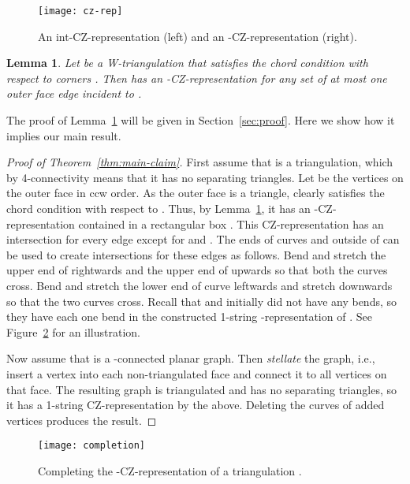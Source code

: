 \documentclass{article}
\renewcommand{\int}[1]{}
\newtheorem{lemma}[theorem]{Lemma}
\begin{document}
\begin{figure}
    \centering
    \texttt{[image: cz-rep]}
    \caption{An int-CZ-representation (left) 
and an \int{(C,c_2)}-CZ-representation (right).}
    \label{fig:partial-cz-ex}
\end{figure}

\begin{lemma}
	\label{lem:representation}
    Let  be a W-triangulation that 
    satisfies the chord condition with respect to corners . 
	Then  has an \int{F}-CZ-representation
    for any set  of at most one outer face edge incident to .
\end{lemma}

The proof of Lemma~\ref{lem:representation} will be given in Section~\ref{sec:proof}. Here we show how it implies our main result.

\begin{proof}[Proof of Theorem~\ref{thm:main-claim}]
First assume that  is a triangulation, which by 4-con\-nec\-tivity means that
it has no separating triangles. Let  be the vertices on the outer face
in ccw order.
As the outer face is a triangle,  clearly satisfies the chord condition with respect to .
Thus, by Lemma~\ref{lem:representation}, it has an
\int{(B,C)}-CZ-representation contained in a rectangular box .  This
CZ-representation has an intersection for 
every edge except for  and . The  ends of curves  and 
outside of  can be used to create intersections for these edges
as follows.
Bend and stretch the upper end of  rightwards and the upper end of  upwards so that
both the curves cross. 
Bend and stretch the lower end of curve  leftwards and stretch  downwards so that the two curves cross.
Recall that  and  initially did not have any bends, so they have each one bend in the
constructed 1-string 
-representation of . See Figure~\ref{fig:completion} for an illustration.

Now assume that  is a -connected planar graph. Then \emph{stellate} the graph, i.e.,
insert a vertex into each non-triangulated face and connect it to all vertices on that face.
The resulting graph is triangulated and has no separating triangles, so it has a 1-string CZ-representation
by the above. Deleting the curves of added vertices produces the result. 
\end{proof}

\begin{figure}
    \centering
    \texttt{[image: completion]}
    \caption{Completing the \int{F}-CZ-representation of a triangulation .}
    \label{fig:completion}
\end{figure}
\end{document}
